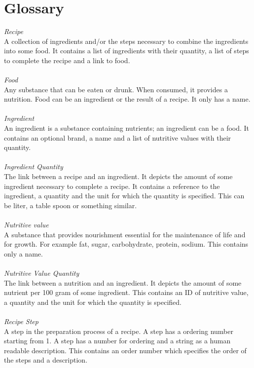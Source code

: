 \section{Glossary}
\textit{Recipe} \\
A collection of ingredients and/or the steps necessary to combine the ingredients into some food. It contains a list of ingredients with their quantity, a list of steps to complete the recipe and a link to food. \\ \\
\textit{Food} \\
Any substance that can be eaten or drunk. When consumed, it provides a nutrition. Food can be an ingredient or the result of a recipe. It only has a name. \\ \\
\textit{Ingredient} \\
An ingredient is a substance containing nutrients; an ingredient can be a food. It contains an optional brand, a name and a list of nutritive values with their quantity. \\ \\
\textit{Ingredient Quantity} \\
The link between a recipe and an ingredient. 
It depicts the amount of some ingredient necessary to complete a recipe.
It contains a reference to the ingredient, a quantity and the unit for which the quantity is specified. This can be liter, a table spoon or something similar.
\\ \\
\textit{Nutritive value} \\
A substance that provides nourishment essential for the maintenance of life and for growth. For example fat, sugar, carbohydrate, protein, sodium. This contains only a name. \\ \\
\textit{Nutritive Value Quantity} \\
The link between a nutrition and an ingredient. 
It depicts the amount of some nutrient per 100 gram of some ingredient. This contains an ID of nutritive value, a quantity and the unit for which the quantity is specified.\\ \\
\textit{Recipe Step} \\
A step in the preparation process of a recipe. A step has a ordering number starting from 1. A step has a number for ordering and a string as a human readable description. This contains an order number which specifies the order of the steps and a description.

